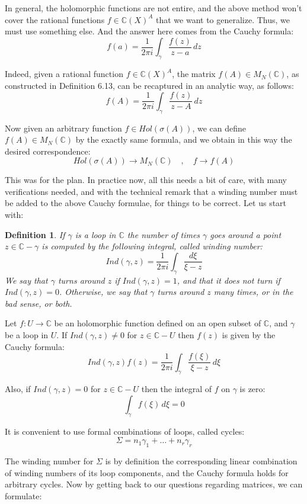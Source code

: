 \documentclass[12pt]{amsbook}
\newtheorem{definition}[theorem]{Definition}
\begin{document}
\bigskip

In general, the holomorphic functions are not entire, and the above method won't cover the rational functions $f\in\mathbb C(X)^A$ that we want to generalize. Thus, we must use something else. And the answer here comes from the Cauchy formula:
$$f(a)=\frac{1}{2\pi i}\int_\gamma\frac{f(z)}{z-a}\,dz$$

Indeed, given a rational function $f\in\mathbb C(X)^A$, the matrix $f(A)\in M_N(\mathbb C)$, as constructed in Definition 6.13, can be recaptured in an analytic way, as follows:
$$f(A)=\frac{1}{2\pi i}\int_\gamma\frac{f(z)}{z-A}\,dz$$

Now given an arbitrary function $f\in Hol(\sigma(A))$, we can define $f(A)\in M_N(\mathbb C)$ by the exactly same formula, and we obtain in this way the desired correspondence:
$$Hol(\sigma(A))\to M_N(\mathbb C)\quad,\quad 
f\to f(A)$$

This was for the plan. In practice now, all this needs a bit of care, with many verifications needed, and with the technical remark that a winding number must be added to the above Cauchy formulae, for things to be correct. Let us start with:

\begin{definition}
If $\gamma$ is a loop in $\mathbb C$ the number of times $\gamma$ goes around a point $z\in\mathbb C-\gamma$ is computed by the following integral, called winding number:
$$Ind(\gamma,z)=\frac{1}{2\pi i}\int_\gamma\frac{d\xi}{\xi -z}$$
We say that $\gamma$ turns around $z$ if $Ind(\gamma,z)=1$, and that it does not turn if $Ind(\gamma,z)=0$. Otherwise, we say that $\gamma$ turns around $z$ many times, or in the bad sense, or both.
\end{definition}

Let $f:U\to\mathbb C$ be an holomorphic function defined on an open subset of $\mathbb C$, and $\gamma$ be a loop in $U$. If $Ind(\gamma,z)\neq 0$ for $z\in\mathbb C-U$ then $f(z)$ is given by the Cauchy formula:
$$Ind(\gamma,z)f(z)=\frac{1}{2\pi i}\int_\gamma\frac{f(\xi )}{\xi -z}\,d\xi$$

Also, if $Ind(\gamma,z)=0$ for $z\in\mathbb C-U$ then the integral of $f$ on $\gamma$ is zero:
$$\int_\gamma f(\xi)\,d\xi=0$$

It is convenient to use formal combinations of loops, called cycles:
$$\Sigma=n_1\gamma_1+\ldots +n_r\gamma_r$$

The winding number for $\Sigma$ is by definition the corresponding linear combination of winding numbers of its loop components, and the Cauchy formula holds for arbitrary cycles. Now by getting back to our questions regarding matrices, we can formulate:
\end{document}
